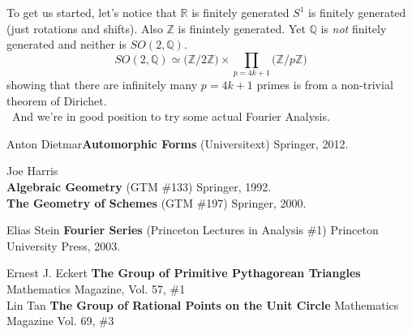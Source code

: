\documentclass[12pt]{article}
\begin{document}
\newpage

\noindent To get us started, let's notice that $\mathbb{R}$ is finitely generated $S^1$ is finitely generated (just rotations and shifts).  Also $\mathbb{Z}$ is finintely generated. Yet $\mathbb{Q}$ is \textit{not} finitely generated and neither is $SO(2, \mathbb{Q})$. 
$$ SO(2, \mathbb{Q}) \simeq \big(\mathbb{Z}/2\mathbb{Z}\big)\times \prod_{p = 4k+1} \big(\mathbb{Z}/p\mathbb{Z}\big) $$
showing that there are infinitely many $p = 4k+1$ primes is from a non-trivial theorem of Dirichet. \\ \
And we're in good position to try some actual Fourier Analysis.

\vfill
\begin{thebibliography}{}

\item Anton Dietmar\textbf{Automorphic Forms} (Universitext)  Springer, 2012.

\item Joe Harris \\ 
\textbf{Algebraic Geometry} \hspace{0.52in}(GTM \#133)  Springer, 1992. \\
\textbf{The Geometry of Schemes} (GTM \#197) Springer, 2000.

\item Elias Stein \textbf{Fourier Series} (Princeton Lectures in Analysis \#1) Princeton University Press, 2003.

\item Ernest J. Eckert \textbf{The Group of Primitive Pythagorean Triangles} Mathematics Magazine, Vol. 57, \#1  \\
Lin Tan \textbf{The Group of Rational Points on the Unit Circle}  Mathematics Magazine Vol. 69, \#3  


\end{thebibliography}
\end{document}
